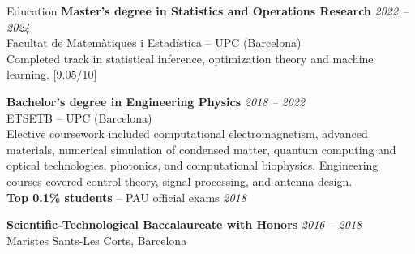 \documentclass{resume} %
\begin{document}
\begin{rSection}{Education}
{\bf Master's degree in Statistics and Operations Research} \hfill {\em 2022 -- 2024} 
\\ Facultat de Matem\`atiques i Estad\'istica -- UPC (Barcelona) \vspace{0.5em} \\
Completed track in statistical inference, optimization theory and machine learning. [9.05/10]


{\bf Bachelor's degree in Engineering Physics} \hfill {\em 2018 -- 2022} 
\\ ETSETB -- UPC (Barcelona) \vspace{0.5em} \\ 
Elective coursework included computational electromagnetism, advanced materials, numerical simulation 
of condensed matter, quantum computing and optical technologies, photonics, and computational biophysics. 
Engineering courses covered control theory, signal processing, and antenna design.\\

{\bf Top 0.1\% students} -- PAU official exams \hfill {\em 2018} 

{\bf Scientific-Technological Baccalaureate with Honors} \hfill {\em 2016 -- 2018} 
\\ Maristes Sants-Les Corts, Barcelona \\
\end{rSection}
\end{document}
